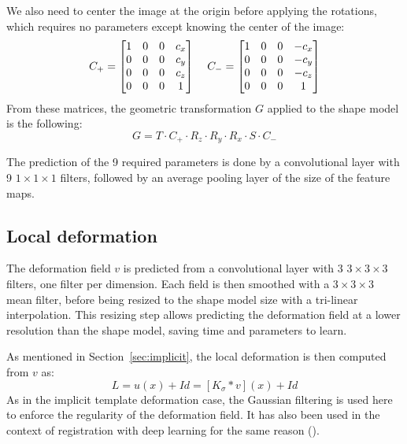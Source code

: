 We also need to center the image at the origin before applying the rotations, which requires no parameters except knowing the center of the image:
\begin{equation*}
    C_+ = 
    \begin{bmatrix}
        1 & 0 & 0 & c_x \\
        0 & 0 & 0 & c_y \\
        0 & 0 & 0 & c_z \\ 
        0 & 0 & 0 & 1
    \end{bmatrix}
    \mkern20mu
    C_- = 
    \begin{bmatrix}
        1 & 0 & 0 & -c_x \\
        0 & 0 & 0 & -c_y \\
        0 & 0 & 0 & -c_z \\ 
        0 & 0 & 0 & 1
    \end{bmatrix}
\end{equation*}
From these matrices, the geometric transformation $G$ applied to the shape model is the following:
\begin{equation}
    G = T \cdot C_+ \cdot R_z \cdot R_y \cdot R_x \cdot S \cdot C_-
\end{equation}

The prediction of the 9 required parameters is done by a convolutional layer with 9 $1 \times 1 \times 1$ filters, followed by an average pooling layer of the size of the feature maps. 

\subsection{Local deformation}
\label{ssec:seg_local}

The deformation field $v$ is predicted from a convolutional layer with 3 $3 \times 3 \times 3$ filters, one filter per dimension. Each field is then smoothed with a $3 \times 3 \times 3$ mean filter, before being resized to the shape model size with a tri-linear interpolation. This resizing step allows predicting the deformation field at a lower resolution than the shape model, saving time and parameters to learn.

As mentioned in Section~\ref{sec:implicit}, the local deformation is then computed from $v$ as:
\begin{equation}
    L = u(x) + Id = [K_{\sigma} * v](x) + Id
\end{equation}
As in the implicit template deformation case, the Gaussian filtering is used here to enforce the regularity of the deformation field. It has also been used in the context of registration with deep learning for the same reason (\textcite{krebs2019}).

